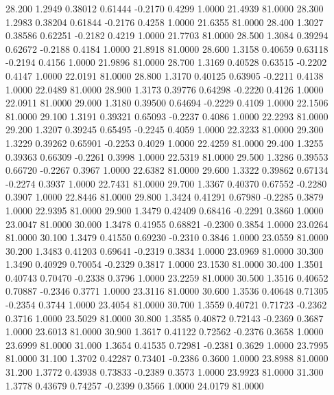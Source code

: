   28.200   1.2949   0.38012   0.61444  -0.2170   0.4299   1.0000  21.4939  81.0000
  28.300   1.2983   0.38204   0.61844  -0.2176   0.4258   1.0000  21.6355  81.0000
  28.400   1.3027   0.38586   0.62251  -0.2182   0.4219   1.0000  21.7703  81.0000
  28.500   1.3084   0.39294   0.62672  -0.2188   0.4184   1.0000  21.8918  81.0000
  28.600   1.3158   0.40659   0.63118  -0.2194   0.4156   1.0000  21.9896  81.0000
  28.700   1.3169   0.40528   0.63515  -0.2202   0.4147   1.0000  22.0191  81.0000
  28.800   1.3170   0.40125   0.63905  -0.2211   0.4138   1.0000  22.0489  81.0000
  28.900   1.3173   0.39776   0.64298  -0.2220   0.4126   1.0000  22.0911  81.0000
  29.000   1.3180   0.39500   0.64694  -0.2229   0.4109   1.0000  22.1506  81.0000
  29.100   1.3191   0.39321   0.65093  -0.2237   0.4086   1.0000  22.2293  81.0000
  29.200   1.3207   0.39245   0.65495  -0.2245   0.4059   1.0000  22.3233  81.0000
  29.300   1.3229   0.39262   0.65901  -0.2253   0.4029   1.0000  22.4259  81.0000
  29.400   1.3255   0.39363   0.66309  -0.2261   0.3998   1.0000  22.5319  81.0000
  29.500   1.3286   0.39553   0.66720  -0.2267   0.3967   1.0000  22.6382  81.0000
  29.600   1.3322   0.39862   0.67134  -0.2274   0.3937   1.0000  22.7431  81.0000
  29.700   1.3367   0.40370   0.67552  -0.2280   0.3907   1.0000  22.8446  81.0000
  29.800   1.3424   0.41291   0.67980  -0.2285   0.3879   1.0000  22.9395  81.0000
  29.900   1.3479   0.42409   0.68416  -0.2291   0.3860   1.0000  23.0047  81.0000
  30.000   1.3478   0.41955   0.68821  -0.2300   0.3854   1.0000  23.0264  81.0000
  30.100   1.3479   0.41550   0.69230  -0.2310   0.3846   1.0000  23.0559  81.0000
  30.200   1.3483   0.41203   0.69641  -0.2319   0.3834   1.0000  23.0969  81.0000
  30.300   1.3490   0.40929   0.70054  -0.2329   0.3817   1.0000  23.1530  81.0000
  30.400   1.3501   0.40743   0.70470  -0.2338   0.3796   1.0000  23.2259  81.0000
  30.500   1.3516   0.40652   0.70887  -0.2346   0.3771   1.0000  23.3116  81.0000
  30.600   1.3536   0.40648   0.71305  -0.2354   0.3744   1.0000  23.4054  81.0000
  30.700   1.3559   0.40721   0.71723  -0.2362   0.3716   1.0000  23.5029  81.0000
  30.800   1.3585   0.40872   0.72143  -0.2369   0.3687   1.0000  23.6013  81.0000
  30.900   1.3617   0.41122   0.72562  -0.2376   0.3658   1.0000  23.6999  81.0000
  31.000   1.3654   0.41535   0.72981  -0.2381   0.3629   1.0000  23.7995  81.0000
  31.100   1.3702   0.42287   0.73401  -0.2386   0.3600   1.0000  23.8988  81.0000
  31.200   1.3772   0.43938   0.73833  -0.2389   0.3573   1.0000  23.9923  81.0000
  31.300   1.3778   0.43679   0.74257  -0.2399   0.3566   1.0000  24.0179  81.0000

